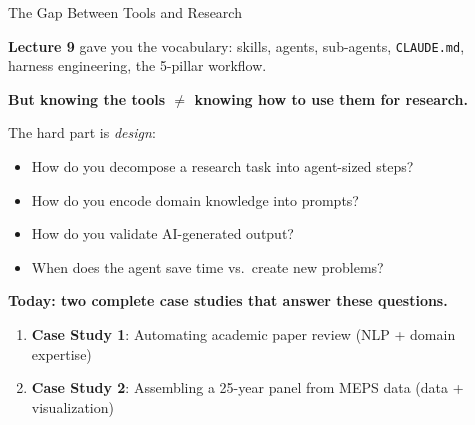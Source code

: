 \documentclass[10pt,english,aspectratio=169]{beamer}
\begin{document}
\begin{frame}{The Gap Between Tools and Research}

\textbf{Lecture 9} gave you the vocabulary: skills, agents, sub-agents, \texttt{CLAUDE.md}, harness engineering, the 5-pillar workflow.

\vspace{0.3cm}
\textbf{But knowing the tools $\neq$ knowing how to use them for research.}

\vspace{0.3cm}
The hard part is \emph{design}:
\begin{itemize}
    \item How do you decompose a research task into agent-sized steps?
    \item How do you encode domain knowledge into prompts?
    \item How do you validate AI-generated output?
    \item When does the agent save time vs.\ create new problems?
\end{itemize}

\vspace{0.3cm}
\textbf{Today: two complete case studies that answer these questions.}
\begin{enumerate}
    \item \textbf{Case Study 1}: Automating academic paper review (NLP + domain expertise)
    \item \textbf{Case Study 2}: Assembling a 25-year panel from MEPS data (data + visualization)
\end{enumerate}

\end{frame}
\end{document}
